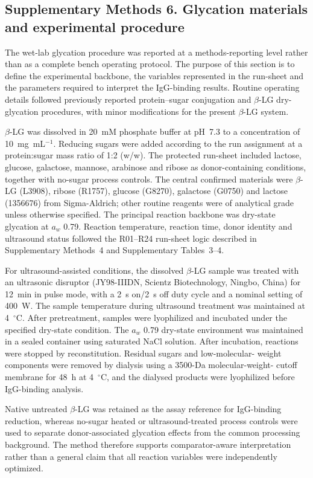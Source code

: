 \subsection*{Supplementary Methods 6. Glycation materials and experimental procedure}

The wet-lab glycation procedure was reported at a methods-reporting level rather
than as a complete bench operating protocol. The purpose of this section is to
define the experimental backbone, the variables represented in the run-sheet and
the parameters required to interpret the IgG-binding results. Routine operating
details followed previously reported protein--sugar conjugation and $\beta$-LG
dry-glycation procedures, with minor modifications for the present $\beta$-LG
system.

$\beta$-LG was dissolved in 20~mM phosphate buffer at pH~7.3 to a concentration
of 10~mg~mL$^{-1}$. Reducing sugars were added according to the run assignment
at a protein:sugar mass ratio of 1:2 (w/w). The protected run-sheet included
lactose, glucose, galactose, mannose, arabinose and ribose as donor-containing
conditions, together with no-sugar process controls. The central confirmed
materials were $\beta$-LG (L3908), ribose (R1757), glucose (G8270), galactose
(G0750) and lactose (1356676) from Sigma-Aldrich; other routine reagents were of
analytical grade unless otherwise specified. The principal reaction backbone was
dry-state glycation at $a_w$ 0.79. Reaction temperature, reaction time, donor
identity and ultrasound status followed the R01--R24 run-sheet logic described
in Supplementary Methods~4 and Supplementary Tables~3--4.

For ultrasound-assisted conditions, the dissolved $\beta$-LG sample was treated
with an ultrasonic disruptor (JY98-IIIDN, Scientz Biotechnology, Ningbo, China)
for 12~min in pulse mode, with a 2~s on/2~s off duty cycle and a nominal setting
of 400~W. The sample temperature during ultrasound treatment was maintained at
4~$^\circ$C. After pretreatment, samples were lyophilized and incubated under
the specified dry-state condition. The $a_w$ 0.79 dry-state environment was
maintained in a sealed container using saturated NaCl solution. After incubation,
reactions were stopped by reconstitution. Residual sugars and low-molecular-
weight components were removed by dialysis using a 3500-Da molecular-weight-
cutoff membrane for 48~h at 4~$^\circ$C, and the dialysed products were
lyophilized before IgG-binding analysis.

Native untreated $\beta$-LG was retained as the assay reference for IgG-binding
reduction, whereas no-sugar heated or ultrasound-treated process controls were
used to separate donor-associated glycation effects from the common processing
background. The method therefore supports comparator-aware interpretation rather
than a general claim that all reaction variables were independently optimized.

